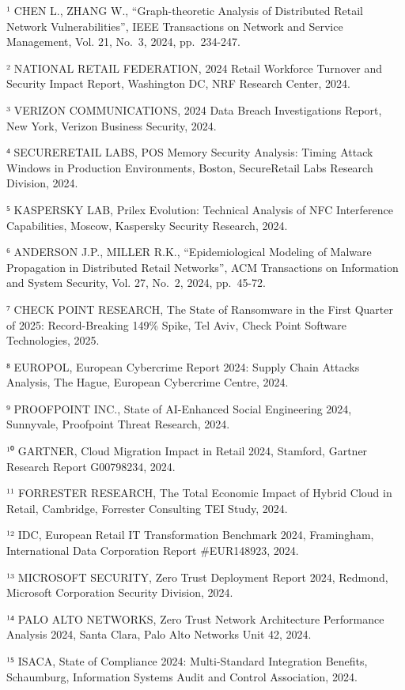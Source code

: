 \documentclass[12pt,a4paper,oneside]{book}
\begin{document}
¹ CHEN L., ZHANG W., ``Graph-theoretic Analysis of Distributed Retail
Network Vulnerabilities'', IEEE Transactions on Network and Service
Management, Vol. 21, No.~3, 2024, pp.~234-247.

² NATIONAL RETAIL FEDERATION, 2024 Retail Workforce Turnover and
Security Impact Report, Washington DC, NRF Research Center, 2024.

³ VERIZON COMMUNICATIONS, 2024 Data Breach Investigations Report, New
York, Verizon Business Security, 2024.

⁴ SECURERETAIL LABS, POS Memory Security Analysis: Timing Attack Windows
in Production Environments, Boston, SecureRetail Labs Research Division,
2024.

⁵ KASPERSKY LAB, Prilex Evolution: Technical Analysis of NFC
Interference Capabilities, Moscow, Kaspersky Security Research, 2024.

⁶ ANDERSON J.P., MILLER R.K., ``Epidemiological Modeling of Malware
Propagation in Distributed Retail Networks'', ACM Transactions on
Information and System Security, Vol. 27, No.~2, 2024, pp.~45-72.

⁷ CHECK POINT RESEARCH, The State of Ransomware in the First Quarter of
2025: Record-Breaking 149\% Spike, Tel Aviv, Check Point Software
Technologies, 2025.

⁸ EUROPOL, European Cybercrime Report 2024: Supply Chain Attacks
Analysis, The Hague, European Cybercrime Centre, 2024.

⁹ PROOFPOINT INC., State of AI-Enhanced Social Engineering 2024,
Sunnyvale, Proofpoint Threat Research, 2024.

¹⁰ GARTNER, Cloud Migration Impact in Retail 2024, Stamford, Gartner
Research Report G00798234, 2024.

¹¹ FORRESTER RESEARCH, The Total Economic Impact of Hybrid Cloud in
Retail, Cambridge, Forrester Consulting TEI Study, 2024.

¹² IDC, European Retail IT Transformation Benchmark 2024, Framingham,
International Data Corporation Report \#EUR148923, 2024.

¹³ MICROSOFT SECURITY, Zero Trust Deployment Report 2024, Redmond,
Microsoft Corporation Security Division, 2024.

¹⁴ PALO ALTO NETWORKS, Zero Trust Network Architecture Performance
Analysis 2024, Santa Clara, Palo Alto Networks Unit 42, 2024.

¹⁵ ISACA, State of Compliance 2024: Multi-Standard Integration Benefits,
Schaumburg, Information Systems Audit and Control Association, 2024.
\end{document}
